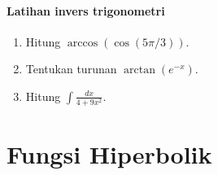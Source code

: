 \documentclass{../../kalkulus-ppt}
\begin{document}
\begin{frame}{\insertsection}
    \framesubtitle{Latihan invers trigonometri}
    \begin{latihan}
        \begin{enumerate}
            \item Hitung $\arccos(\cos(5\pi/3))$.
            \item Tentukan turunan $\arctan(e^{-x})$.
            \item Hitung $\displaystyle\int\frac{dx}{4+9x^2}$.
        \end{enumerate}
    \end{latihan}
\end{frame}

\section{Fungsi Hiperbolik}
\end{document}
